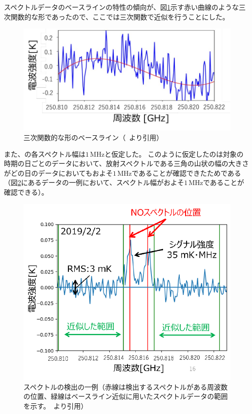 スペクトルデータのベースラインの特性の傾向が、図\ref{fig:baseline_curve}示す赤い曲線のような三次関数的な形であったので、ここでは三次関数で近似を行うことにした。
\begin{figure}[htbp]
    \centering
    \includegraphics[width=\linewidth]{master_thesis_contents/master_thesis_fig/baseline_curve.pdf}
    \caption{三次関数的な形のベースライン（~\cite{goto2021bachelor}より引用）}
    \label{fig:baseline_curve}
\end{figure}
また、の各スペクトル幅は$1\, \mathrm{MHz}$と仮定した。
このように仮定したのは対象の時期の日ごとのデータにおいて、放射スペクトルである三角の山状の幅の大きさがどの日のデータにおいてもおよそ$1\, \mathrm{MHz}$であることが確認できたためである（図\ref{fig:no_spectr_exp}にあるデータの一例において、スペクトル幅がおよそ$1\, \mathrm{MHz}$であることが確認できる）。
\begin{figure}[htbp]
    \centering
    \includegraphics[width=\linewidth]{master_thesis_contents/master_thesis_fig/no_spectr_exp.pdf}
    \caption{スペクトルの検出の一例（赤線は検出するスペクトルがある周波数の位置、緑線はベースライン近似に用いたスペクトルデータの範囲を示す。~\cite{goto2021bachelor}より引用）}
    \label{fig:no_spectr_exp}
\end{figure}
\clearpage


